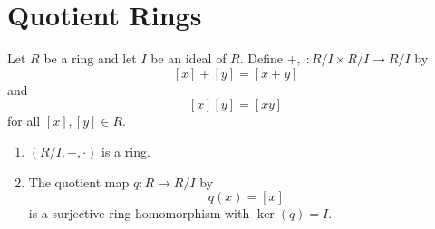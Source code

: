 \documentclass[pmath347]{subfiles}
\begin{document}
    \section{Quotient Rings}
    
    \begin{theorem}{}
        Let $R$ be a ring and let $I$ be an ideal of $R$. Define $+,\cdot:R /I\times R /I\to R /I$ by
        \begin{equation*}
            \left[ x \right] + \left[ y \right] = \left[ x+y \right] 
        \end{equation*}
        and
        \begin{equation*}
            \left[ x \right] \left[ y \right] = \left[ xy \right] 
        \end{equation*}
        for all $\left[ x \right] , \left[ y \right] \in R$. 
        \begin{enumerate}
            \item $\left( R /I, +,\cdot\right)$ is a ring. 
            \item The quotient map $q:R\to R /I$ by
                \begin{equation*}
                    q\left( x \right) = \left[ x \right] 
                \end{equation*}
                is a surjective ring homomorphism with $\ker\left( q \right) = I$.
        \end{enumerate}
    \end{theorem}
\end{document}
